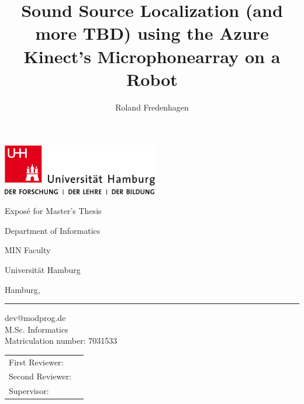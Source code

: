 \documentclass[
    fontsize=12pt,
    headings=small,
    parskip=half,           %
    bibliography=totoc,
    numbers=noenddot,       %
    open=any,               %
]{scrreprt}
\title{Sound Source Localization (and more TBD) using the Azure Kinect's
    Microphonearray on a Robot}
\author{Roland Fredenhagen}
\newcommand{\firstreviewer}{}
\newcommand{\secondreviewer}{}
\newcommand{\supervisor}{}
\begin{document}
\begin{titlepage}
    \includegraphics[width=6.8cm]{../pic/up-uhh-logo-u-2010-u-farbe-u-rgb.pdf}
    \makeatletter
    \begin{center}\Large
        \bigskip
        Exposé for Master's Thesis\par
        \bigskip
        {\Large\textsf{\textbf{\@title}}\par}
        \bigskip
        Department of Informatics \par
        MIN Faculty \par
        Universität Hamburg\par
        \bigskip
        Hamburg, {\@date}
        \vfill
    \end{center}
    \large
    \textbf{\@author} \par
    \smallskip
    \hrule
    dev@modprog.de  \\
    M.Sc. Informatics \\
    Matriculation number: 7031533 \par
    \bigskip
    \begin{tabular}{@{}ll}
        First Reviewer:  & \firstreviewer  \\
        Second Reviewer: & \secondreviewer \\
        Supervisor:      & \supervisor     \\
    \end{tabular}
\end{titlepage}
\end{document}
